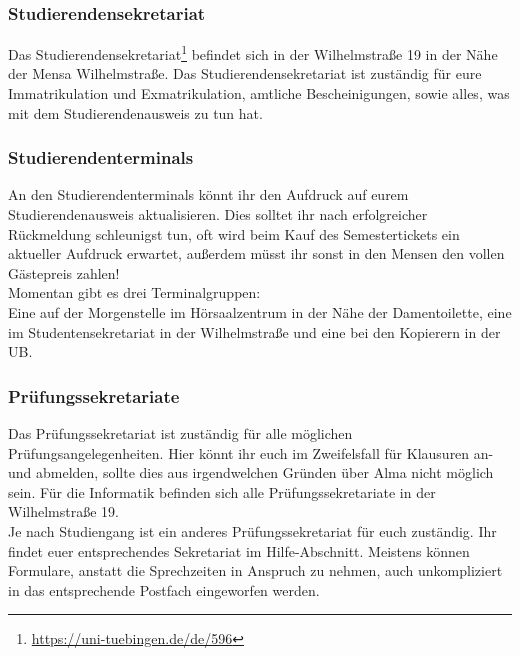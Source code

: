 \subsubsection*{Studierendensekretariat}
Das Studierendensekretariat\footnote{\url{https://uni-tuebingen.de/de/596}} befindet sich in der Wilhelmstraße 19 in der Nähe der Mensa Wilhelmstraße. Das Studierendensekretariat ist zuständig für eure Immatrikulation und Exmatrikulation, amtliche Bescheinigungen, sowie alles, was mit dem Studierendenausweis zu tun hat.	%

\subsubsection*{Studierendenterminals}
An den Studierendenterminals könnt ihr den Aufdruck auf eurem
Studierendenausweis aktualisieren. Dies solltet ihr nach erfolgreicher Rückmeldung schleunigst tun, oft wird beim Kauf des Semestertickets ein aktueller Aufdruck erwartet, außerdem müsst ihr sonst in den Mensen
den vollen Gästepreis zahlen!\\
Momentan gibt es drei Terminalgruppen:\\
Eine auf der Morgenstelle im Hörsaalzentrum in der Nähe der Damentoilette,
eine im Studentensekretariat in der Wilhelmstraße und eine bei den Kopierern in der UB.

\subsubsection*{Prüfungssekretariate}
Das Prüfungssekretariat ist zuständig für alle möglichen Prüfungsangelegenheiten. Hier könnt ihr euch im Zweifelsfall für Klausuren an- und abmelden, sollte dies aus irgendwelchen Gründen über Alma nicht möglich sein. Für die Informatik befinden sich alle Prüfungssekretariate in der Wilhelmstraße 19.\\
Je nach Studiengang ist ein anderes Prüfungssekretariat für euch zuständig. Ihr findet euer entsprechendes Sekretariat im Hilfe-Abschnitt. Meistens können Formulare, anstatt die Sprechzeiten in Anspruch zu nehmen, auch unkompliziert in das entsprechende Postfach eingeworfen werden.


